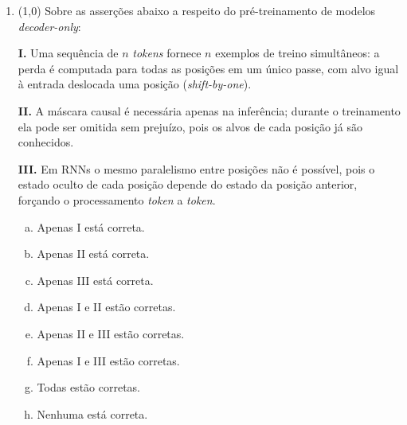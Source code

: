 \documentclass[11pt,a4paper]{article}
\begin{document}
\begin{enumerate}[1)]
Qual \textit{token} do rascunho é rejeitado e qual é o \textit{token} mais provável de ser obtido na reamostragem?

\begin{enumerate}[a)]
    \item Nenhum \textit{token} é rejeitado; os três são aceitos e um \textit{token} extra é amostrado de $p$.
    \item O \textit{token} \texttt{jogo} é rejeitado; o mais provável na reamostragem é \texttt{título}.
    \item O \textit{token} \texttt{de} é rejeitado; o mais provável na reamostragem é \texttt{por}.
    \item O \textit{token} \texttt{ontem} é rejeitado; o mais provável na reamostragem é \texttt{virada}.
    \item O \textit{token} \texttt{ontem} é rejeitado; o mais provável na reamostragem é \texttt{hoje}.
    \item O \textit{token} \texttt{ontem} é rejeitado; o mais provável na reamostragem é \texttt{ontem}.
    \item O \textit{token} \texttt{ontem} é rejeitado; o mais provável na reamostragem é \texttt{novo}.
    \item Os \textit{tokens} \texttt{de} e \texttt{ontem} são rejeitados; nas reamostragens, os mais prováveis são \texttt{por} e \texttt{hoje}.
\end{enumerate}

\item (1{,}0) Sobre as asserções abaixo a respeito do pré-treinamento de modelos \textit{decoder-only}:

\textbf{I.} Uma sequência de $n$ \textit{tokens} fornece $n$ exemplos de treino simultâneos: a perda é computada para todas as posições em um único passe, com alvo igual à entrada deslocada uma posição (\textit{shift-by-one}).

\textbf{II.} A máscara causal é necessária apenas na inferência; durante o treinamento ela pode ser omitida sem prejuízo, pois os alvos de cada posição já são conhecidos.

\textbf{III.} Em RNNs o mesmo paralelismo entre posições não é possível, pois o estado oculto de cada posição depende do estado da posição anterior, forçando o processamento \textit{token} a \textit{token}.

\begin{enumerate}[a)]
    \item Apenas I está correta.
    \item Apenas II está correta.
    \item Apenas III está correta.
    \item Apenas I e II estão corretas.
    \item Apenas II e III estão corretas.
    \item Apenas I e III estão corretas.
    \item Todas estão corretas.
    \item Nenhuma está correta.
\end{enumerate}


\end{enumerate}
\end{document}
